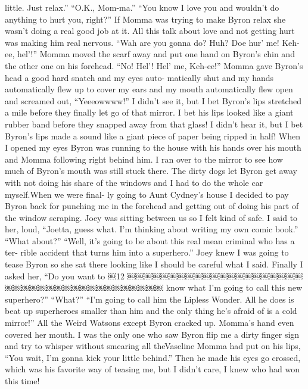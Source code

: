 \documentclass{standard}
\begin{document}
little. Just relax.”
“O.K., Mom-ma.”
“You know I love you and wouldn’t do anything to hurt you,
right?” If Momma was trying to make Byron relax she wasn’t doing a real good job at it. All this talk about love and not getting hurt was making him real nervous.
“Wah are you gonna do? Huh? Doe hur’ me! Keh-ee, hel’!”
Momma moved the scarf away and put one hand on Byron’s chin and the other one on his forehead.
“No! Hel’! Hel’ me, Keh-ee!”
Momma gave Byron’s head a good hard snatch and my eyes auto- matically shut and my hands automatically flew up to cover my ears and my mouth automatically flew open and screamed out, “Yeeeowwww!”
I didn’t see it, but I bet Byron’s lips stretched a mile before they finally let go of that mirror. I bet his lips looked like a giant rubber band before they snapped away from that glass!
I didn’t hear it, but I bet Byron’s lips made a sound like a giant piece of paper being ripped in half!
When I opened my eyes Byron was running to the house with his hands over his mouth and Momma following right behind him. I ran over to the mirror to see how much of Byron’s mouth was still stuck there.
The dirty dogs let Byron get away with not doing his share of the windows and I had to do the whole car myself.When we were final- ly going to Aunt Cydney’s house I decided to pay Byron back for punching me in the forehead and getting out of doing his part of the window scraping. Joey was sitting between us so I felt kind of safe. I said to her, loud, “Joetta, guess what. I’m thinking about writing my own comic book.”
“What about?”
“Well, it’s going to be about this real mean criminal who has a ter- rible accident that turns him into a superhero.”
Joey knew I was going to tease Byron so she sat there looking like I should be careful what I said. Finally I asked her, “Do you want to
￼12
￼￼￼￼￼￼￼￼￼￼￼￼￼￼￼￼￼￼￼￼￼￼￼￼￼￼￼￼￼￼￼￼￼￼￼￼￼￼￼￼
know what I’m going to call this new superhero?” “What?”
“I’m going to call him the Lipless Wonder. All he does is beat up superheroes smaller than him and the only thing he’s afraid of is a cold mirror!”
All the Weird Watsons except Byron cracked up. Momma’s hand even covered her mouth. I was the only one who saw Byron flip me a dirty finger sign and try to whisper without smearing all theVaseline Momma had put on his lips, “You wait, I’m gonna kick your little behind.” Then he made his eyes go crossed, which was his favorite way of teasing me, but I didn’t care, I knew who had won this time!
\end{document}
